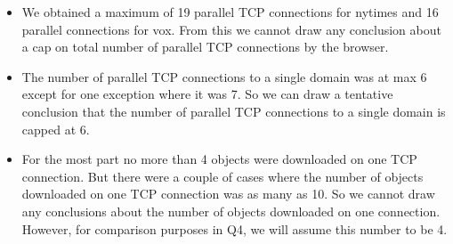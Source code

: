 \documentclass[12pt]{article}
\begin{document}
\begin{itemize}
\item We obtained a maximum of 19 parallel TCP connections for nytimes and 16 parallel connections for vox. From this we cannot draw any conclusion about a cap on total number of parallel TCP connections by the browser. 
\item The number of parallel TCP connections to a single domain was at max 6 except for one exception where it was 7. So we can draw a tentative conclusion that the number of parallel TCP connections to a single domain is capped at 6.
\item For the most part no more than 4 objects were downloaded on one TCP connection. But there were a couple of cases where the number of objects downloaded on one TCP connection was as many as 10. So we cannot draw any conclusions about the number of objects downloaded on one connection. However, for comparison purposes in Q4, we will assume this number to be 4. 
\end{itemize}
\end{document}
